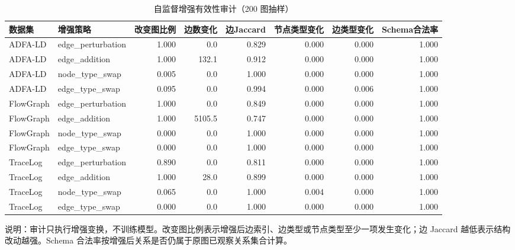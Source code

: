 \begin{table}[t]
\centering
\scriptsize
\renewcommand{\arraystretch}{0.98}
\setlength{\tabcolsep}{4pt}
\caption{自监督增强有效性审计（200 图抽样）}
\label{tab:ssl_augmentation_audit}
\begin{tabular}{llrrrrrr}
\toprule
数据集 & 增强策略 & 改变图比例 & 边数变化 & 边Jaccard & 节点类型变化 & 边类型变化 & Schema合法率 \\
\midrule
ADFA-LD & edge\_perturbation & 1.000 & 0.0 & 0.829 & 0.000 & 0.000 & 1.000 \\
ADFA-LD & edge\_addition & 1.000 & 132.1 & 0.912 & 0.000 & 0.000 & 1.000 \\
ADFA-LD & node\_type\_swap & 0.005 & 0.0 & 1.000 & 0.000 & 0.000 & 1.000 \\
ADFA-LD & edge\_type\_swap & 0.095 & 0.0 & 0.994 & 0.000 & 0.006 & 1.000 \\
\midrule
FlowGraph & edge\_perturbation & 1.000 & 0.0 & 0.849 & 0.000 & 0.000 & 1.000 \\
FlowGraph & edge\_addition & 1.000 & 5105.5 & 0.747 & 0.000 & 0.000 & 1.000 \\
FlowGraph & node\_type\_swap & 0.000 & 0.0 & 1.000 & 0.000 & 0.000 & 1.000 \\
FlowGraph & edge\_type\_swap & 0.000 & 0.0 & 1.000 & 0.000 & 0.000 & 1.000 \\
\midrule
TraceLog & edge\_perturbation & 0.890 & 0.0 & 0.811 & 0.000 & 0.000 & 1.000 \\
TraceLog & edge\_addition & 1.000 & 28.0 & 0.899 & 0.000 & 0.000 & 1.000 \\
TraceLog & node\_type\_swap & 0.065 & 0.0 & 1.000 & 0.004 & 0.000 & 1.000 \\
TraceLog & edge\_type\_swap & 0.000 & 0.0 & 1.000 & 0.000 & 0.000 & 1.000 \\
\bottomrule
\end{tabular}%
\par\vspace{2pt}
\begin{minipage}{\textwidth}
\scriptsize
说明：审计只执行增强变换，不训练模型。改变图比例表示增强后边索引、边类型或节点类型至少一项发生变化；边 Jaccard 越低表示结构改动越强。Schema 合法率按增强后关系是否仍属于原图已观察关系集合计算。
\end{minipage}
\end{table}
